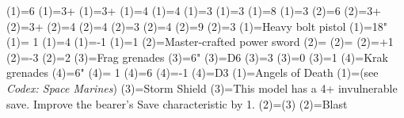 \renewcommand{\UnitName}{Bladeguard Veterans }%
\renewcommand{\UnitPower}{5}%
\renewcommand{\UnitIcon}{Elites.svg}%
%
\renewcommand{\StatBlocks}{2}%
\Movement(1)={6}%
\WeaponSkill(1)={3+}%
\BalisticSkill(1)={3+}%
\Strength(1)={4}%
\Toughness(1)={4}%
\Wounds(1)={3}%
\Attacks(1)={3}%
\Leadership(1)={8}%
\Save(1)={3}%
%
\Movement(2)={6}%
\WeaponSkill(2)={3+}%
\BalisticSkill(2)={3+}%
\Strength(2)={4}%
\Toughness(2)={4}%
\Wounds(2)={3}%
\Attacks(2)={4}%
\Leadership(2)={9}%
\Save(2)={3}%
%
\renewcommand{\UnitText}{2 \UnitName and 1 Sergeant. Each model is equiped with: \WeaponName(1); \WeaponName(2); \WeaponName(3); \WeaponName(4); and \AbilityName(3).}%
%
\renewcommand{\NumWeapon}{4}%
\WeaponName(1)={Heavy bolt pistol}%
\WeaponRange(1)={18"}%
\WeaponType(1)={ 1}%
\WeaponStrength(1)={4}%
\WeaponAP(1)={-1}%
\WeaponDamage(1)={1}%
%
\WeaponName(2)={Master-crafted power sword}%
\WeaponRange(2)={}%
\WeaponType(2)={}%
\WeaponStrength(2)={+1}%
\WeaponAP(2)={-3}%
\WeaponDamage(2)={2}%
%
\WeaponName(3)={Frag grenades}%
\WeaponRange(3)={6"}%
\WeaponType(3)={D6}%
\WeaponStrength(3)={3}%
\WeaponAP(3)={0}%
\WeaponDamage(3)={1}%
%
\WeaponName(4)={Krak grenades}%
\WeaponRange(4)={6"}%
\WeaponType(4)={ 1}%
\WeaponStrength(4)={6}%
\WeaponAP(4)={-1}%
\WeaponDamage(4)={D3}%
%
\renewcommand{\NumAbilities}{2}%
\AbilityName(1)={Angels of Death}%
\AbilityDescription(1)={(see \textit{Codex: Space Marines})}%
%
\AbilityName(3)={Storm Shield}%
\AbilityDescription(3)={This model has a 4+ invulnerable save. Improve the bearer's Save characteristic by 1.}%
%
\AbilityName(2)={\WeaponName(3)}%
\AbilityDescription(2)={Blast}%
%
\renewcommand{\FactionKeywords}{Imperium, Adeptus Astartes, <Chapter>}%
\renewcommand{\Keywords}{Infantry, Primaris, Bladeguard, Bladeguard Veteran Squad}%
\newcommand{\ExtraFrontTitle}{\AbilityName(3)}%
\renewcommand{\ExtraFrontText}{\AbilityDescription(3)}%
\endinput%